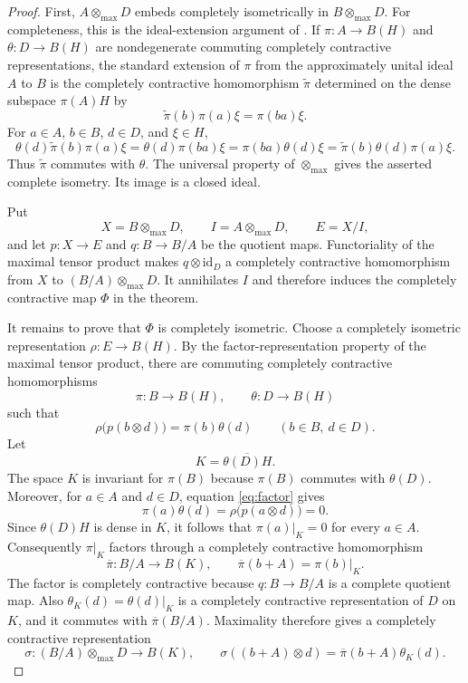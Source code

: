 \documentclass[11pt]{article}
\newcommand{\otmax}{\mathbin{\otimes_{\max}}}
\begin{document}
\begin{proof}
First, $A\otmax D$ embeds completely isometrically in $B\otmax D$.
For completeness, this is the ideal-extension argument of
\cite[Proposition 2.5]{BlecherDuncan}.  If
$\pi:A\to B(H)$ and $\theta:D\to B(H)$ are nondegenerate commuting
completely contractive representations, the standard extension of $\pi$ from
the approximately unital ideal $A$ to $B$ is the completely contractive
homomorphism $\widetilde\pi$ determined on the dense subspace $\pi(A)H$ by
\[
 \widetilde\pi(b)\pi(a)\xi=\pi(ba)\xi.
\]
For $a\in A$, $b\in B$, $d\in D$, and $\xi\in H$,
\[
 \theta(d)\widetilde\pi(b)\pi(a)\xi
 =\theta(d)\pi(ba)\xi
 =\pi(ba)\theta(d)\xi
 =\widetilde\pi(b)\theta(d)\pi(a)\xi.
\]
Thus $\widetilde\pi$ commutes with $\theta$.  The universal property of
$\otmax$ gives the asserted complete isometry.  Its image is a closed ideal.

Put
\[
 X=B\otmax D,\qquad I=A\otmax D,\qquad E=X/I,
\]
and let $p:X\to E$ and $q:B\to B/A$ be the quotient maps.  Functoriality of
the maximal tensor product makes $q\otimes\mathrm{id}_D$ a completely
contractive homomorphism from $X$ to $(B/A)\otmax D$.  It annihilates $I$ and
therefore induces the completely contractive map $\Phi$ in the theorem.

It remains to prove that $\Phi$ is completely isometric.  Choose a completely
isometric representation $\rho:E\to B(H)$.  By the factor-representation
property of the maximal tensor product, there are commuting completely
contractive homomorphisms
\[
 \pi:B\to B(H),\qquad \theta:D\to B(H)
\]
such that
\begin{equation}\label{eq:factor}
 \rho\bigl(p(b\otimes d)\bigr)=\pi(b)\theta(d)
 \qquad (b\in B,\ d\in D).
\end{equation}
Let
\[
 K=\overline{\theta(D)H}.
\]
The space $K$ is invariant for $\pi(B)$ because $\pi(B)$ commutes with
$\theta(D)$.  Moreover, for $a\in A$ and $d\in D$, equation
\eqref{eq:factor} gives
\[
 \pi(a)\theta(d)=\rho\bigl(p(a\otimes d)\bigr)=0.
\]
Since $\theta(D)H$ is dense in $K$, it follows that
$\pi(a)|_K=0$ for every $a\in A$.  Consequently $\pi|_K$ factors through a
completely contractive homomorphism
\[
 \overline\pi:B/A\to B(K),\qquad
 \overline\pi(b+A)=\pi(b)|_K.
\]
The factor is completely contractive because $q:B\to B/A$ is a complete
quotient map.  Also $\theta_K(d)=\theta(d)|_K$ is a completely contractive
representation of $D$ on $K$, and it commutes with $\overline\pi(B/A)$.
Maximality therefore gives a completely contractive representation
\[
 \sigma:(B/A)\otmax D\to B(K),\qquad
 \sigma((b+A)\otimes d)=\overline\pi(b+A)\theta_K(d).
\]


\end{proof}
\end{document}
